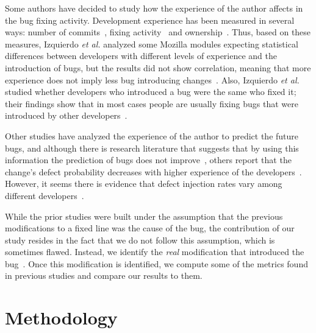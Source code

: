 \documentclass[10pt, conference]{IEEEtran}
\begin{document}
Some authors have decided to study how the experience of the author affects in the bug fixing activity. Development experience has been measured in several ways: number of commits~\cite{eyolfson2011time}, fixing activity~\cite{ahsan2010mining} and ownership~\cite{german2004using}. Thus, based on these measures, Izquierdo \emph{et al.} analyzed some Mozilla modules expecting statistical differences between developers with different levels of experience and the introduction of bugs, but the results did not show correlation, meaning that more experience does not imply less bug introducing changes~\cite{izquierdo2012more}. Also, Izquierdo \emph{et al.} studied whether developers who introduced a bug were the same who fixed it; their findings show that in most cases people are usually fixing bugs that were introduced by other developers~\cite{izquierdo2011developers}.

Other studies have analyzed the experience of the author to predict the future bugs, and although there is research literature that suggests that by using this information the prediction of bugs does not improve~\cite{weyuker2010programmer}, others report that the change's defect probability decreases with higher experience of the developers~\cite{mockus2000predicting}. However, it seems there is evidence that defect injection rates vary among different developers~\cite{matsumoto2010analysis}.


While the prior studies were built under the assumption that the previous modifications to a fixed line was the cause of the bug, the contribution of our study resides in the fact that we do not follow this assumption, which is sometimes flawed. Instead, we identify the \emph{real} modification that introduced the bug~\cite{rodriguez2016bugtracking}. Once this modification is identified, we compute some of the metrics found in previous studies and compare our results to them.

\section{Methodology}
\label{sec:methodology}
\end{document}
